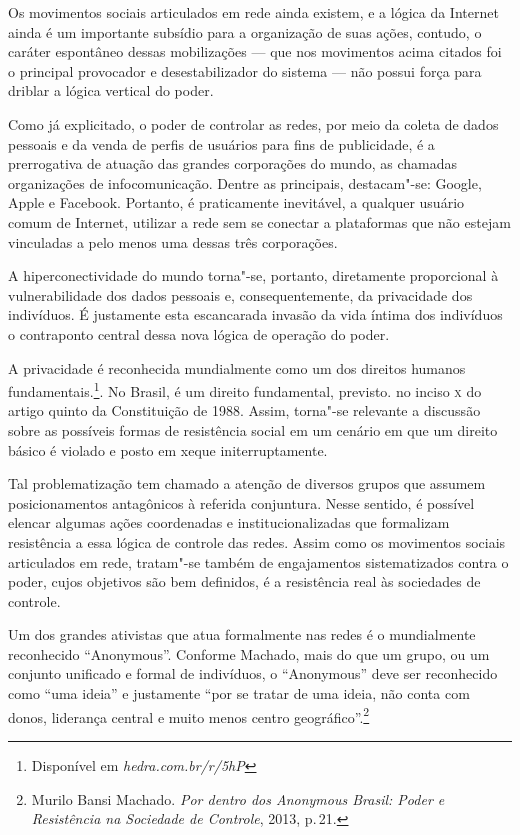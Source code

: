 Os movimentos sociais articulados em rede ainda existem, e a lógica da
Internet ainda é um importante subsídio para a organização de suas
ações, contudo, o caráter espontâneo dessas mobilizações --- que nos
movimentos acima citados foi o principal provocador e desestabilizador
do sistema --- não possui força para driblar a lógica vertical do poder.

Como já explicitado, o poder de controlar as redes, por meio da coleta
de dados pessoais e da venda de perfis de usuários para fins de
publicidade, é a prerrogativa de atuação das grandes corporações do
mundo, as chamadas organizações de infocomunicação. Dentre as
principais, destacam"-se: Google, Apple e Facebook. Portanto, é
praticamente inevitável, a qualquer usuário comum de Internet, utilizar
a rede sem se conectar a plataformas que não estejam vinculadas a pelo
menos uma dessas três corporações.

A hiperconectividade do mundo torna"-se, portanto, diretamente
proporcional à vulnerabilidade dos dados pessoais e, consequentemente,
da privacidade dos indivíduos. É justamente esta escancarada invasão da
vida íntima dos indivíduos o contraponto central dessa nova lógica de
operação do poder.

A privacidade é reconhecida mundialmente como um dos direitos humanos
fundamentais.\footnote{Disponível em \textit{hedra.com.br/r/5hP}}. No Brasil, é um direito fundamental, previsto.
no inciso \textsc{x} do artigo quinto da Constituição de 1988.
Assim, torna"-se relevante a discussão sobre as possíveis formas de
resistência social em um cenário em que um direito básico é violado e
posto em xeque initerruptamente.

Tal problematização tem chamado a atenção de diversos grupos que assumem
posicionamentos antagônicos à referida conjuntura. Nesse sentido, é
possível elencar algumas ações coordenadas e institucionalizadas que
formalizam resistência a essa lógica de controle das redes. Assim como
os movimentos sociais articulados em rede, tratam"-se também de
engajamentos sistematizados contra o poder, cujos objetivos são bem
definidos, é a resistência real às sociedades de controle.

Um dos grandes ativistas que atua formalmente nas redes é o mundialmente
reconhecido ``Anonymous''. Conforme Machado, mais do que um
grupo, ou um conjunto unificado e formal de indivíduos, o ``Anonymous''
deve ser reconhecido como ``uma ideia'' e justamente ``por se tratar de
uma ideia, não conta com donos, liderança central e muito menos centro
geográfico''.\footnote{Murilo Bansi Machado. \textit{Por dentro dos Anonymous Brasil: Poder e
Resistência na Sociedade de Controle}, 2013, p.\,21.}


